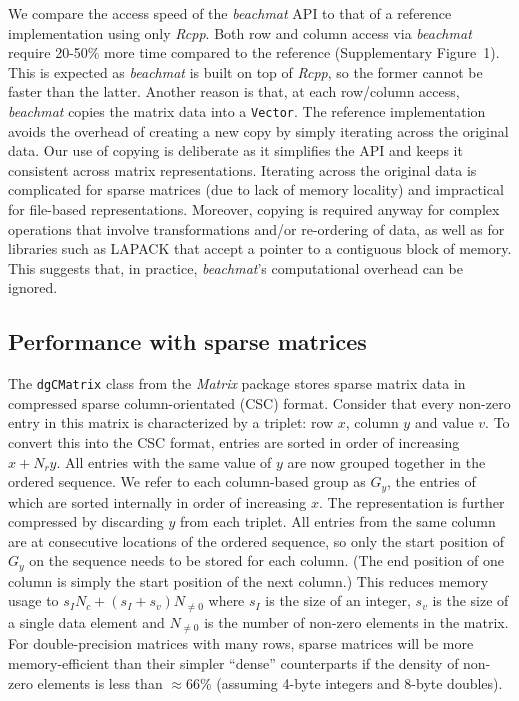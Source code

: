 \documentclass[10pt,letterpaper]{article}
\newcommand{\beachmat}{\textit{beachmat}}
\newcommand{\code}[1]{\texttt{#1}}
\newcommand{\suppfigsimpleaccess}{1}
\begin{document}
We compare the access speed of the \beachmat{} API to that of a reference implementation using only \textit{Rcpp}.
Both row and column access via \beachmat{} require 20-50\% more time compared to the reference (Supplementary Figure~\suppfigsimpleaccess{}).
This is expected as \beachmat{} is built on top of \textit{Rcpp}, so the former cannot be faster than the latter.
Another reason is that, at each row/column access, \beachmat{} copies the matrix data into a \code{Vector}.
The reference implementation avoids the overhead of creating a new copy by simply iterating across the original data.
Our use of copying is deliberate as it simplifies the API and keeps it consistent across matrix representations. 
Iterating across the original data is complicated for sparse matrices (due to lack of memory locality) and impractical for file-based representations.
Moreover, copying is required anyway for complex operations that involve transformations and/or re-ordering of data, as well as for libraries such as LAPACK that accept a pointer to a contiguous block of memory.
This suggests that, in practice, \beachmat{}'s computational overhead can be ignored.

\subsection*{Performance with sparse matrices}
The \code{dgCMatrix} class from the \textit{Matrix} package stores sparse matrix data in compressed sparse column-orientated (CSC) format.
Consider that every non-zero entry in this matrix is characterized by a triplet: row $x$, column $y$ and value $v$.
To convert this into the CSC format, entries are sorted in order of increasing $x + N_ry$.
All entries with the same value of $y$ are now grouped together in the ordered sequence.
We refer to each column-based group as $G_y$, the entries of which are sorted internally in order of increasing $x$.
The representation is further compressed by discarding $y$ from each triplet.
All entries from the same column are at consecutive locations of the ordered sequence, so only the start position of $G_y$ on the sequence needs to be stored for each column.
(The end position of one column is simply the start position of the next column.)
This reduces memory usage to $s_IN_c + (s_I + s_v) N_{\ne 0}$ where $s_I$ is the size of an integer, $s_v$ is the size of a single data element and $N_{\ne 0}$ is the number of non-zero elements in the matrix.
For double-precision matrices with many rows, sparse matrices will be more memory-efficient than their simpler ``dense'' counterparts if the density of non-zero elements is less than $\approx66$\% (assuming 4-byte integers and 8-byte doubles). 
\end{document}
